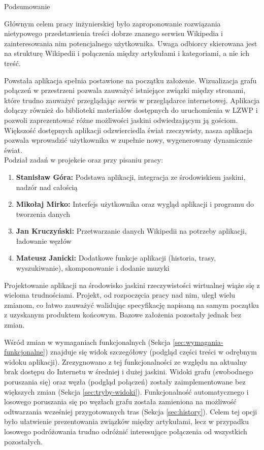 \begin{chapter}{Podsumowanie}
	\newcommand{\chapterPath}{rozdzialy/7_podsumowanie}
	\label{ch:podsumowanie}
	
	Głównym celem pracy inżynierskiej było zaproponowanie rozwiązania nietypowego przedstawienia treści dobrze znanego serwisu Wikipedia i zainteresowania nim potencjalnego użytkownika. Uwaga odbiorcy skierowana jest na strukturę Wikipedii i połączenia między artykułami i kategoriami, a nie ich treść.

	Powstała aplikacja spełnia postawione na początku założenie. Wizualizacja grafu połączeń w przestrzeni pozwala zauważyć istniejące związki między stronami, które trudno zauważyć przeglądając serwis w przeglądarce internetowej. Aplikacja dołączy również do biblioteki materiałów dostępnych do uruchomienia w LZWP i pozwoli zaprezentować różne możliwości jaskini odwiedzającym ją gościom. Większość dostępnych aplikacji odzwierciedla świat rzeczywisty, nasza aplikacja pozwala wprowadzić użytkownika w zupełnie nowy, wygenerowany dynamicznie świat.\\

	\noindent Podział zadań w projekcie oraz przy pisaniu pracy:
	\begin{enumerate}[label=\textbullet]
		\item \textbf{Stanisław Góra:} \newline Podstawa aplikacji, integracja ze środowiskiem jaskini, nadzór nad całością
		\item \textbf{Mikołaj Mirko:} \newline Interfejs użytkownika oraz wygląd aplikacji i programu do tworzenia danych
		\item \textbf{Jan Kruczyński:} \newline Przetwarzanie danych Wikipedii na potrzeby aplikacji, ładowanie węzłów
		\item \textbf{Mateusz Janicki:} \newline Dodatkowe funkcje aplikacji (historia, trasy, wyszukiwanie), skomponowanie i dodanie muzyki
	\end{enumerate}
	
	Projektowanie aplikacji na środowisko jaskini rzeczywistości wirtualnej wiąże się z wieloma trudnościami. Projekt, od rozpoczęcia pracy nad nim, uległ wielu zmianom, co łatwo zauważyć walidując specyfikację napisaną na samym początku z uzyskanym produktem końcowym. Bazowe założenia pozostały jednak bez zmian.

	Wśród zmian w wymaganiach funkcjonalnych (Sekcja \ref{sec:wymagania-funkcjonalne}) znajduje się widok szczegółowy (podgląd części treści w odrębnym widoku aplikacji). Zrezygnowano z tej funkcjonalności ze względu na aktualny brak dostępu do Internetu w średniej i dużej jaskini. Widoki grafu (swobodnego poruszania się) oraz węzła (podgląd połączeń) zostały zaimplementowane bez większych zmian (Sekcja \ref{sec:tryby-widoki}). Funkcjonalność automatycznego i losowego poruszania się po węzłach grafu została zamieniona na możliwość odtwarzania wcześniej przygotowanych tras (Sekcja \ref{sec:history}). Celem tej opcji było ułatwienie prezentowania związków między artykułami, lecz w przypadku losowego podróżowania trudno odróżnić interesujące połączenia od wszystkich pozostałych.


\end{chapter}
